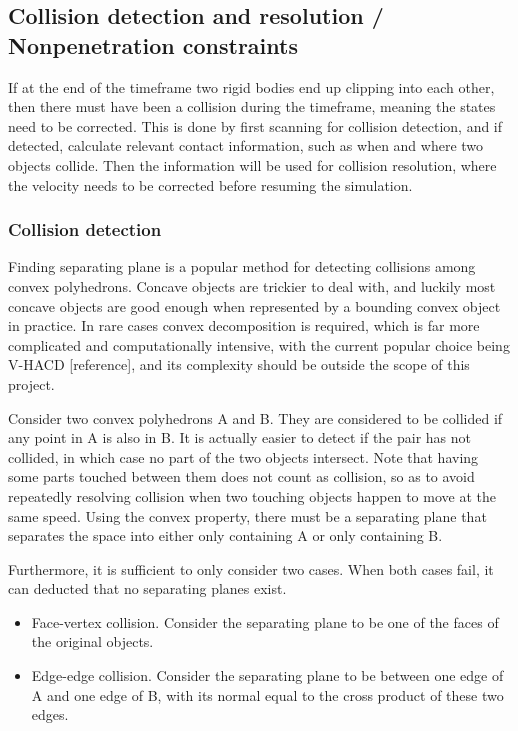 \documentclass[runningheads]{llncs}
\begin{document}
\subsection{Collision detection and resolution / Nonpenetration constraints}

If at the end of the timeframe two rigid bodies end up clipping into each other, then there must have been a collision during the timeframe, meaning the states need to be corrected. This is done by first scanning for collision detection, and if detected, calculate relevant contact information, such as when and where two objects collide. Then the information will be used for collision resolution, where the velocity needs to be corrected before resuming the simulation.

\subsubsection{Collision detection}

Finding separating plane is a popular method for detecting collisions among convex polyhedrons. Concave objects are trickier to deal with, and luckily most concave objects are good enough when represented by a bounding convex object in practice. In rare cases convex decomposition is required, which is far more complicated and computationally intensive, with the current popular choice being V-HACD [reference], and its complexity should be outside the scope of this project.

Consider two convex polyhedrons A and B. They are considered to be collided if any point in A is also in B. It is actually easier to detect if the pair has not collided, in which case no part of the two objects intersect. Note that having some parts touched between them does not count as collision, so as to avoid repeatedly resolving collision when two touching objects happen to move at the same speed. Using the convex property, there must be a separating plane that separates the space into either only containing A or only containing B.

Furthermore, it is sufficient to only consider two cases. When both cases fail, it can deducted that no separating planes exist.

\begin{itemize}
\item Face-vertex collision. Consider the separating plane to be one of the faces of the original objects.
\item Edge-edge collision. Consider the separating plane to be between one edge of A and one edge of B, with its normal equal to the cross product of these two edges. 
\end{itemize}
\end{document}

